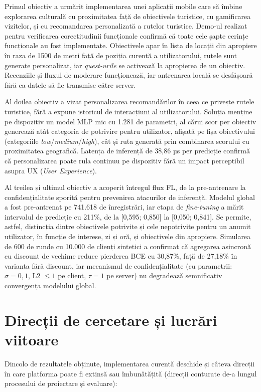 \documentclass[12pt,a4paper]{report}
\begin{document}
Primul obiectiv a urmărit implementarea unei aplicații mobile care să îmbine explorarea culturală cu proximitatea față de obiectivele turistice, cu gamificarea vizitelor, și cu recomandarea personalizată a rutelor turistice. Demo-ul realizat pentru verificarea corectitudinii funcționale confirmă că toate cele șapte cerințe funcționale au fost implementate. Obiectivele apar în lista de locații din apropiere în raza de 1500 de metri față de poziția curentă a utilizatorului, rutele sunt generate personalizat, iar \textit{quest-urile} se activează la apropierea de un obiectiv. Recenziile și fluxul de moderare funcționează, iar antrenarea locală se desfășoară fără ca datele să fie transmise către server.

Al doilea obiectiv a vizat personalizarea recomandărilor în ceea ce privește rutele turistice, fără a expune istoricul de interacțiuni al utilizatorului. Soluția menține pe dispozitiv un model MLP mic cu 1.281 de parametri, al cărui scor per obiectiv generează atât categoria de potrivire pentru utilizator, afișată pe fișa obiectivului (categoriile \textit{low}/\textit{medium}/\textit{high}), cât și ruta generată prin combinarea scorului cu proximitatea geografică. Latența de inferență de 38,86 µs per predicție confirmă că personalizarea poate rula continuu pe dispozitiv fără un impact perceptibil asupra UX (\textit{User Experience}).

Al treilea și ultimul obiectiv a acoperit întregul flux FL, de la pre-antrenare la confidențialitate sporită pentru prevenirea atacurilor de inferență. Modelul global a fost pre-antrenat pe 741.618 de înregistrări, iar etapa de \textit{fine-tuning} a mărit intervalul de predicție cu 211\%, de la [0,595; 0,850] la [0,050; 0,841]. Se permite, astfel, distincția dintre obiectivele potrivite și cele nepotrivite pentru un anumit utilizator, în funcție de interese, zi și oră, și obiectivele din apropiere. Simularea de 600 de runde cu 10.000 de clienți sintetici a confirmat că agregarea asincronă cu discount de vechime reduce pierderea BCE cu 30,87\%, față de 27,18\% în varianta fără discount, iar mecanismul de confidențialitate (cu parametrii: $\sigma = 0{,}1$, L2 $\leq1$ pe client, $\tau = 1$ pe server) nu degradează semnificativ convergența modelului global.

\section{Direcții de cercetare și lucrări viitoare}

Dincolo de rezultatele obținute, implementarea curentă deschide și câteva direcții în care platforma poate fi extinsă sau îmbunătățită (direcții conturate de-a lungul procesului de proiectare și evaluare):
\end{document}
